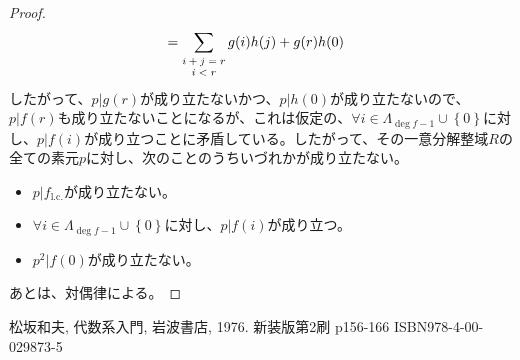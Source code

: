 \documentclass[dvipdfmx]{jsarticle}
\begin{document}
\begin{proof}
\begin{align*}
&= \sum_{\scriptsize \begin{matrix} i + j = r \\ i < r \end{matrix}} {g(i)h(j)} + g(r)h(0)
\end{align*}
したがって、$p|g(r)$が成り立たないかつ、$p|h(0)$が成り立たないので、$p|f(r)$も成り立たないことになるが、これは仮定の、$\forall i \in \varLambda_{\deg f - 1} \cup \left\{ 0 \right\}$に対し、$p|f(i)$が成り立つことに矛盾している。したがって、その一意分解整域$R$の全ての素元$p$に対し、次のことのうちいづれかが成り立たない。
\begin{itemize}
\item
  $p|f_{\mathrm{l.c.}}$が成り立たない。
\item
  $\forall i \in \varLambda_{\deg f - 1} \cup \left\{ 0 \right\}$に対し、$p|f(i)$が成り立つ。
\item
  $p^{2}|f(0)$が成り立たない。
\end{itemize}
あとは、対偶律による。
\end{proof}
\begin{thebibliography}{50}
  松坂和夫, 代数系入門, 岩波書店, 1976. 新装版第2刷 p156-166 ISBN978-4-00-029873-5
\end{thebibliography}
\end{document}
